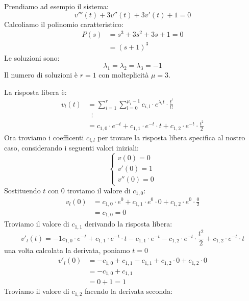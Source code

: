 \documentclass[a4paper]{article}
\begin{document}
\begin{example}
  Prendiamo ad esempio il sistema:
  \[
    v'''(t) + 3v''(t) + 3v'(t) + 1 = 0
  \] 
  Calcoliamo il polinomio caratteristico:
  \[
    \begin{aligned}
      P(s) &= s^3 + 3s^2 + 3s + 1 = 0 \\
           &= (s + 1)^3
    \end{aligned}
  \] 
  Le soluzioni sono:
  \[
  \lambda_1 = \lambda_2 = \lambda_3 = -1
  \] 
  Il numero di soluzioni è \( r = 1 \) con molteplicità \( \mu = 3 \).

  \vspace{1em}
  \noindent
  La risposta libera è:
  \[
    \begin{aligned}
      v_l(t) &= \sum_{i=1}^{r} \sum_{l=0}^{\mu_i-1} c_{i,l} \cdot e^{\lambda_i t} \cdot \frac{t^l}{l!} \\
             &\;\;\vdots\\
             &= c_{1,0} \cdot e^{-t} + c_{1,1} \cdot e^{-t} \cdot t + c_{1,2} \cdot e^{-t} \cdot \frac{t^2}{2}
    \end{aligned}
  \] 
  Ora troviamo i coefficenti \( c_{i,l} \) per trovare la risposta libera specifica
  al nostro caso, considerando i seguenti valori iniziali: 
  \[
  \begin{cases}
    v(0) = 0\\
    v'(0) = 1\\
    v''(0) = 0
  \end{cases}
  \] 
  Sostituendo \( t \) con \( 0 \) troviamo il valore di \( c_{1,0} \):
  \[
  \begin{aligned}
    v_l(0) &= c_{1,0} \cdot e^0 + c_{1,1} \cdot e^0 \cdot 0 + c_{1,2} \cdot e^0 \cdot \frac{0}{2}\\
           &= c_{1,0} = 0
  \end{aligned}
  \] 
  Troviamo il valore di \( c_{1,1} \) derivando la risposta libera:
  \[
    v'_l(t) = -1 c_{1,0} \cdot e^{-t} + c_{1,1} \cdot e^{-t} \cdot t - c_{1,1} \cdot e^{-t} 
    - c_{1,2} \cdot e^{-t} \cdot \frac{t^2}{2} + c_{1,2} \cdot e^{-t} \cdot t
  \] 
  una volta calcolata la derivata, poniamo \( t = 0 \) 
  \[
  \begin{aligned}
    v'_l(0) &= -c_{1,0} + c_{1,1} - c_{1,1} + c_{1,2} \cdot 0 + c_{1,2} \cdot 0\\
            &= -c_{1,0} + c_{1,1} \\
            &= 0 + 1 = 1
  \end{aligned}
  \] 
  Troviamo il valore di \( c_{1,2} \) facendo la derivata seconda:

\end{example}
\end{document}
